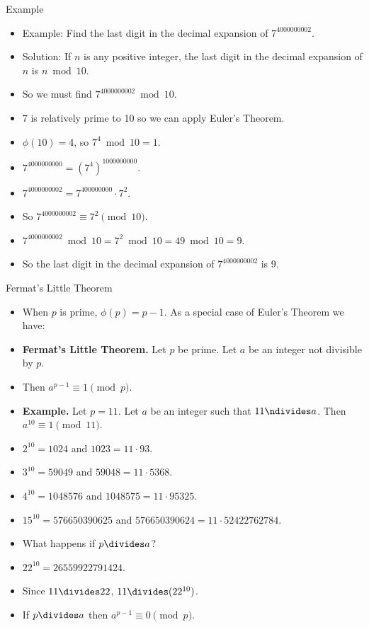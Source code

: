 \documentclass[handout]{beamer}
\begin{document}
\begin{frame}{Example}
\begin{itemize}
\item Example: Find the last digit in the decimal expansion of $7^{4000000002}$.
\item Solution: If $n$ is any positive integer, the last digit in the decimal
expansion of $n$ is $n\bmod 10$.
\item So we must find $7^{4000000002} \bmod 10$.
\item 7 is relatively prime to 10 so we can apply Euler's Theorem.
\item $\phi(10) = 4$, so $7^4 \bmod 10 = 1$.
\item $7^{4000000000} = (7^4)^{1000000000}$.
\item $7^{4000000002} = 7^{400000000} \cdot 7^2$.
\item So $7^{4000000002} \equiv 7^2 \pmod{10}$.
\item $7^{4000000002} \bmod 10 = 7^2 \bmod 10 = 49 \bmod 10 = 9$.
\item So the last digit in the decimal expansion of $7^{4000000002}$ is 9.
\end{itemize}
\end{frame}


\begin{frame}{Fermat's Little Theorem}

\begin{itemize}
  \item When $p$ is prime, $\phi(p)=p-1$. As a special case of Euler's Theorem we have:
  \item \textbf{Fermat's Little Theorem.} Let $p$ be prime. Let $a$ be an integer not divisible by $p$.
  \item Then $a^{p-1}\equiv 1 \pmod{p}$.
  \item \textbf{Example.} Let $p=11$. Let $a$ be an integer such that $11\ndivides a$. Then $a^{10} \equiv 1 \pmod{11}$.
  \item $2^{10} = 1024$ and $1023 = 11 \cdot 93$.
  \item $3^{10} = 59049$ and $59048 = 11 \cdot 5368$.
  \item $4^{10} = 1048576$ and $1048575 = 11 \cdot 95325$.
  \item $15^{10} = 576650390625$ and  $576650390624 = 11 \cdot 52422762784$.
  \item What happens if $p\divides a$?
  \item $22^{10} = 26559922791424$.
  \item Since $11\divides 22$, $11\divides (22^{10})$.
  \item If $p\divides a$ then $a^{p-1} \equiv 0 \pmod p$.
\end{itemize}

\end{frame}
\end{document}
